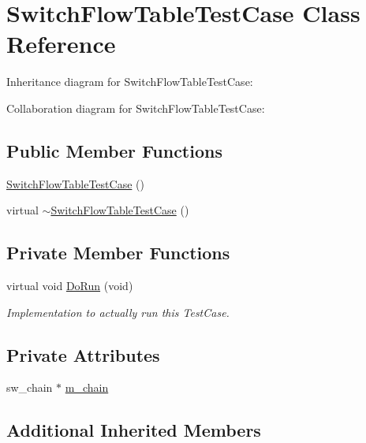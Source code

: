 \hypertarget{classSwitchFlowTableTestCase}{}\section{Switch\+Flow\+Table\+Test\+Case Class Reference}
\label{classSwitchFlowTableTestCase}


Inheritance diagram for Switch\+Flow\+Table\+Test\+Case\+:


Collaboration diagram for Switch\+Flow\+Table\+Test\+Case\+:
\subsection*{Public Member Functions}
\begin{DoxyCompactItemize}
\item 
\hyperlink{classSwitchFlowTableTestCase_a0ac785aa94c3482734aa54a11328a555}{Switch\+Flow\+Table\+Test\+Case} ()
\item 
virtual \hyperlink{classSwitchFlowTableTestCase_a74e1dd69e681f941d0237669b6643b99}{$\sim$\+Switch\+Flow\+Table\+Test\+Case} ()
\end{DoxyCompactItemize}
\subsection*{Private Member Functions}
\begin{DoxyCompactItemize}
\item 
virtual void \hyperlink{classSwitchFlowTableTestCase_a330a8bc3adb7737a3bf98beb7270d677}{Do\+Run} (void)
\begin{DoxyCompactList}\small\item\em Implementation to actually run this Test\+Case. \end{DoxyCompactList}\end{DoxyCompactItemize}
\subsection*{Private Attributes}
\begin{DoxyCompactItemize}
\item 
sw\+\_\+chain $\ast$ \hyperlink{classSwitchFlowTableTestCase_a8f2e13cbf268c880500b1f2898b3558a}{m\+\_\+chain}
\end{DoxyCompactItemize}
\subsection*{Additional Inherited Members}


